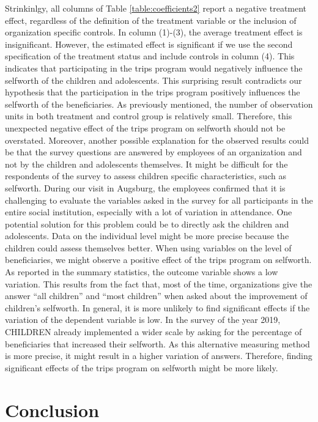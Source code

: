 \documentclass[12pt, a4paper, titlepage]{article}\usepackage[]{graphicx}\usepackage[]{color}
\begin{document}
Strinkinlgy, all columns of Table \ref{table:coefficients2} report a negative treatment effect, regardless of the definition of the treatment variable or the inclusion of organization specific controls. In column (1)-(3), the average treatment effect is insignificant. However, the estimated effect is significant if we use the second specification of the treatment status and include controls in column (4). This indicates that participating in the trips program would negatively influence the selfworth of the children and adolescents. This surprising result contradicts our hypothesis that the participation in the trips program positively influences the selfworth of the beneficiaries. As previously mentioned, the number of observation units in both treatment and control group is relatively small. Therefore, this unexpected negative effect of the trips program on selfworth should not be overstated. Moreover, another possible explanation for the observed results could be that the survey questions are answered by employees of an organization and not by the children and adolescents themselves. It might be difficult for the respondents of the survey to assess children specific characteristics, such as selfworth. During our visit in Augsburg, the employees confirmed that it is challenging to evaluate the variables asked in the survey for all participants in the entire social institution, especially with a lot of variation in attendance. One potential solution for this problem could be to directly ask the children and adolescents. Data on the individual level might be more precise because the children could assess themselves better. When using variables on the level of beneficiaries, we might observe a positive effect of the trips program on selfworth.
As reported in the summary statistics, the outcome variable shows a low variation. This results from the fact that, most of the time, organizations give the answer “all children” and “most children” when asked about the improvement of children’s selfworth. In general, it is more unlikely to find significant effects if the variation of the dependent variable is low. In the survey of the year 2019, CHILDREN already implemented a wider scale by asking for the percentage of beneficiaries that increased their selfworth. As this alternative measuring method is more precise, it might result in a higher variation of answers. Therefore, finding significant effects of the trips program on selfworth might be more likely.

\section{Conclusion}
\end{document}
